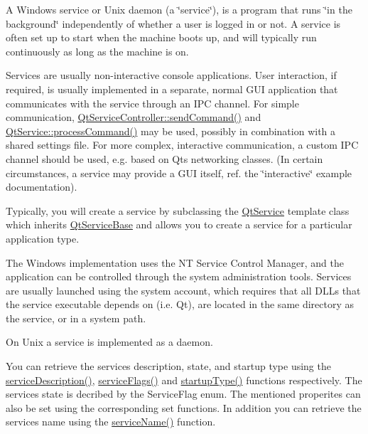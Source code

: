 A Windows service or Unix daemon (a \char`\"{}service\char`\"{}), is a program that runs \char`\"{}in the background\char`\"{} independently of whether a user is logged in or not. A service is often set up to start when the machine boots up, and will typically run continuously as long as the machine is on.

Services are usually non-\/interactive console applications. User interaction, if required, is usually implemented in a separate, normal G\+UI application that communicates with the service through an I\+PC channel. For simple communication, \mbox{\hyperlink{class_qt_service_controller_a1428c7d51403416bc7663ae37c446cfc}{Qt\+Service\+Controller\+::send\+Command()}} and \mbox{\hyperlink{class_qt_service_base_a47485f00f6eba0758d2ffc75092295cf}{Qt\+Service\+::process\+Command()}} may be used, possibly in combination with a shared settings file. For more complex, interactive communication, a custom I\+PC channel should be used, e.\+g. based on Qt\textquotesingle{}s networking classes. (In certain circumstances, a service may provide a G\+UI itself, ref. the \char`\"{}interactive\char`\"{} example documentation).

Typically, you will create a service by subclassing the \mbox{\hyperlink{class_qt_service}{Qt\+Service}} template class which inherits \mbox{\hyperlink{class_qt_service_base}{Qt\+Service\+Base}} and allows you to create a service for a particular application type.

The Windows implementation uses the NT Service Control Manager, and the application can be controlled through the system administration tools. Services are usually launched using the system account, which requires that all D\+L\+Ls that the service executable depends on (i.\+e. Qt), are located in the same directory as the service, or in a system path.

On Unix a service is implemented as a daemon.

You can retrieve the service\textquotesingle{}s description, state, and startup type using the \mbox{\hyperlink{class_qt_service_base_a6cf3ef7bc5d85acb31e99a85fde47397}{service\+Description()}}, \mbox{\hyperlink{class_qt_service_base_aab0b204981c481e098fe72061e3f367a}{service\+Flags()}} and \mbox{\hyperlink{class_qt_service_base_aa1b3bf9b7fc09777b422f49f7bcfbcbe}{startup\+Type()}} functions respectively. The service\textquotesingle{}s state is decribed by the Service\+Flag enum. The mentioned properites can also be set using the corresponding set functions. In addition you can retrieve the service\textquotesingle{}s name using the \mbox{\hyperlink{class_qt_service_base_a643f253b3931e6a6c4e8caa190756214}{service\+Name()}} function.

